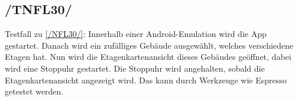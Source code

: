 \subsection*{/TNFL30/}

\label{/TNFL30/} Testfall zu \ref{/NFL30/}: Innerhalb einer \Gls{Android}-\Gls{Emulation} wird die App gestartet.
Danach wird ein zufälliges Gebäude ausgewählt, welches verschiedene Etagen hat.
Nun wird die \Gls{Etagenkartenansicht} dieses Gebäudes geöffnet, dabei wird eine Stoppuhr gestartet.
Die Stoppuhr wird angehalten, sobald die \Gls{Etagenkartenansicht} angezeigt wird.
Das kann durch Werkzeuge wie \Gls{Espresso} getestet werden.